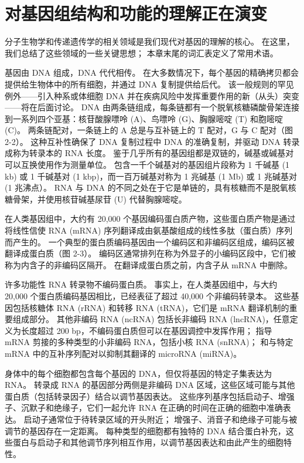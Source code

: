 \section{对基因组结构和功能的理解正在演变}
分子生物学和传递遗传学的相关领域是我们现代对基因的理解的核心。 
在这里，我们总结了这些领域的一些关键思想； 本章末尾的词汇表定义了常用术语。


基因由 DNA 组成，DNA 代代相传。 
在大多数情况下，每个基因的精确拷贝都会提供给生物体中的所有细胞，并通过 DNA 复制提供给后代。 
该一般规则的罕见例外——引入种系或体细胞 DNA 并在疾病风险中发挥重要作用的新（从头）突变——将在后面讨论。 DNA 由两条链组成，每条链都有一个脱氧核糖磷酸骨架连接到一系列四个亚基：核苷酸腺嘌呤 (A)、鸟嘌呤 (G)、胸腺嘧啶 (T) 和胞嘧啶 (C)。 
两条链配对，一条链上的 A 总是与互补链上的 T 配对，G 与 C 配对（图 2-2）。 
这种互补性确保了 DNA 复制过程中 DNA 的准确复制，并驱动 DNA 转录成称为转录本的 RNA 长度。 
鉴于几乎所有的基因组都是双链的，碱基或碱基对可以互换使用作为测量单位。 包含一千个碱基对的基因组片段称为 1 千碱基 (1 kb) 或 1 千碱基对 (1 kbp)，而一百万碱基对称为 1 兆碱基 (1 Mb) 或 1 兆碱基对 (1 兆沸点）。 
RNA 与 DNA 的不同之处在于它是单链的，具有核糖而不是脱氧核糖骨架，并使用核苷碱基尿苷 (U) 代替胸腺嘧啶。


在人类基因组中，大约有 20,000 个基因编码蛋白质产物，这些蛋白质产物是通过将线性信使 RNA (mRNA) 序列翻译成由氨基酸组成的线性多肽（蛋白质）序列而产生的。 
一个典型的蛋白质编码基因由一个编码区和非编码区组成，编码区被翻译成蛋白质（图 2-3）。 
编码区通常排列在称为外显子的小编码区段中，它们被称为内含子的非编码区隔开。 
在翻译成蛋白质之前，内含子从 mRNA 中删除。


许多功能性 RNA 转录物不编码蛋白质。 
事实上，在人类基因组中，与大约 20,000 个蛋白质编码基因相比，已经表征了超过 40,000 个非编码转录本。 
这些基因包括核糖体 RNA (rRNA) 和转移 RNA (tRNA)，它们是 mRNA 翻译机制的重要组成部分。 
其他非编码 RNA (ncRNA) 包括长非编码 RNA (lncRNA)，任意定义为长度超过 200 bp，不编码蛋白质但可以在基因调控中发挥作用； 
指导 mRNA 剪接的多种类型的小非编码 RNA，包括小核 RNA (snRNA)； 
和与特定 mRNA 中的互补序列配对以抑制其翻译的 microRNA (miRNA)。


身体中的每个细胞都包含每个基因的 DNA，但仅将基因的特定子集表达为 RNA。 
转录成 RNA 的基因部分两侧是非编码 DNA 区域，这些区域可能与其他蛋白质（包括转录因子）结合以调节基因表达。 
这些序列基序包括启动子、增强子、沉默子和绝缘子，它们一起允许 RNA 在正确的时间在正确的细胞中准确表达。 
启动子通常位于待转录区域的开头附近； 增强子、消音子和绝缘子可能与被调节的基因存在一定距离。 
每种类型的细胞都有独特的 DNA 结合蛋白补充，这些蛋白与启动子和其他调节序列相互作用，以调节基因表达和由此产生的细胞特性。


